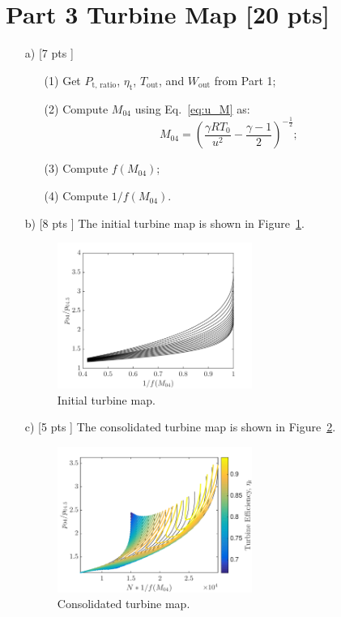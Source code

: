 \documentclass[12pt]{article}
\begin{document}
\section{Part 3 Turbine Map [20 pts]}		
\begin{itemize}
	\item[a) [7 pts]]
		\begin{itemize}
			\item[(1)] Get $P_\text{t, ratio}$, $\eta_\text{t}$, $T_\text{out}$, and $W_\text{out}$ from Part 1;
			\item[(2)] Compute $M_{04}$ using Eq.~\ref{eq:u_M} as:
				\begin{equation}
					M_{04} = \left(\frac{\gamma R T_0}{u^2} - \frac{\gamma - 1}{2} \right)^{-\frac{1}{2}};
				\end{equation}
			\item[(3)] Compute $f(M_{04})$;
			\item[(4)] Compute $1/f(M_{04})$.
		\end{itemize}

	\item[b) [8 pts]]
	The initial turbine map is shown in Figure~\ref{fig:p3b}.
	\begin{figure}[H]
		\centering
		\includegraphics[width=0.6\textwidth]{p3b}
		\caption{Initial turbine map.}
		\label{fig:p3b}
	\end{figure}
	
	\item[c) [5 pts]]
	The consolidated turbine map is shown in Figure~\ref{fig:p3c}.
	\begin{figure}[H]
		\centering
		\includegraphics[width=0.6\textwidth]{p3c}
		\caption{Consolidated turbine map.}
		\label{fig:p3c}
	\end{figure}
		
\end{itemize}
\end{document}
